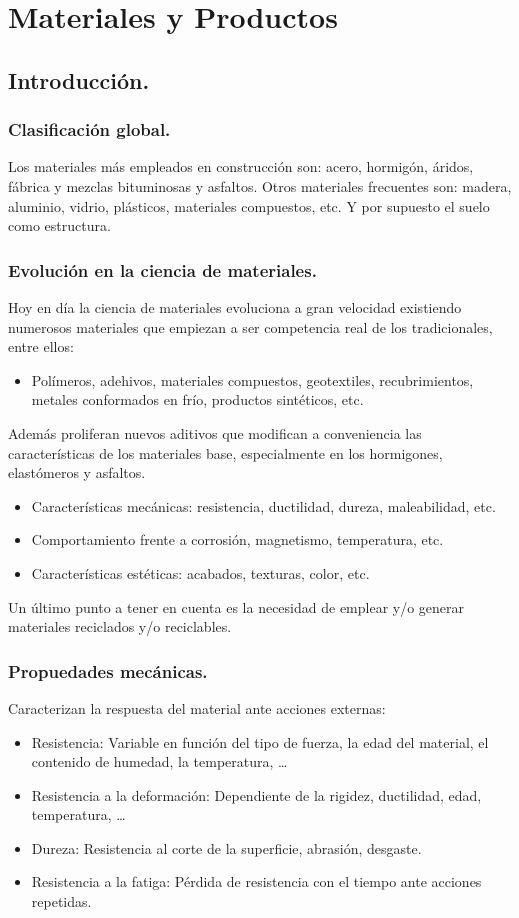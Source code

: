 \chapter{Materiales y Productos}
\section{Introducción.}
\subsection{Clasificación global.}
Los materiales más empleados en construcción son: acero, hormigón, áridos, fábrica y mezclas bituminosas y asfaltos. Otros materiales frecuentes son: madera, aluminio, vidrio, plásticos, materiales compuestos, etc. Y por supuesto el suelo como estructura.

\subsection{Evolución en la ciencia de materiales.}
Hoy en día la ciencia de materiales evoluciona a gran velocidad existiendo numerosos materiales que empiezan a ser competencia real de los tradicionales, entre ellos:
\begin{itemize}
    \item Polímeros, adehivos, materiales compuestos, geotextiles, recubrimientos, metales conformados en frío, productos sintéticos, etc.
\end{itemize}
Además proliferan nuevos aditivos que modifican a conveniencia las características de los materiales base, especialmente en los hormigones, elastómeros y asfaltos.
\begin{itemize}
    \item Características mecánicas: resistencia, ductilidad, dureza, maleabilidad, etc.
    \item Comportamiento frente a corrosión, magnetismo, temperatura, etc.
    \item Características estéticas: acabados, texturas, color, etc.
\end{itemize}
Un último punto a tener en cuenta es la necesidad de emplear y/o generar materiales reciclados y/o reciclables.

\subsection{Propuedades mecánicas.}
Caracterizan la respuesta del material ante acciones externas:
\begin{itemize}
    \item Resistencia: Variable en función del tipo de fuerza, la edad del material, el contenido de humedad, la temperatura, \dots
    \item Resistencia a la deformación: Dependiente de la rigidez, ductilidad, edad, temperatura, \dots
    \item Dureza: Resistencia al corte de la superficie, abrasión, desgaste.
    \item Resistencia a la fatiga: Pérdida de resistencia con el tiempo ante acciones repetidas.
\end{itemize}

